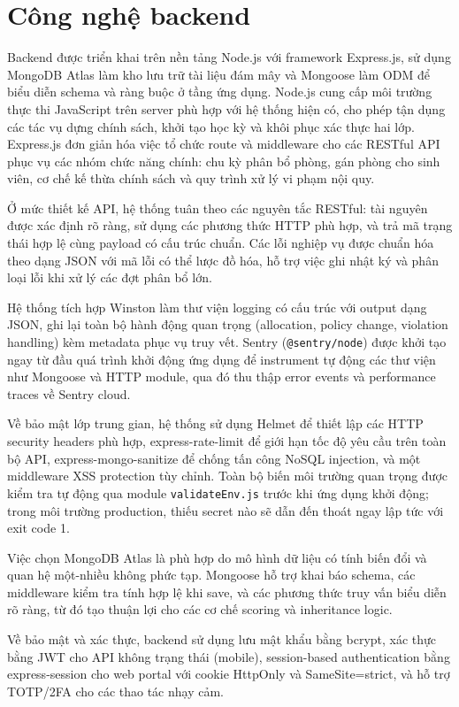﻿\documentclass[a4paper,12pt,openany,oneside]{report}
\begin{document}
\section{Công nghệ backend}

Backend được triển khai trên nền tảng Node.js với framework Express.js, sử dụng MongoDB Atlas làm kho lưu trữ tài liệu đám mây và Mongoose làm ODM để biểu diễn schema và ràng buộc ở tầng ứng dụng. Node.js cung cấp môi trường thực thi JavaScript trên server phù hợp với hệ thống hiện có, cho phép tận dụng các tác vụ dựng chính sách, khởi tạo học kỳ và khôi phục xác thực hai lớp. Express.js đơn giản hóa việc tổ chức route và middleware cho các RESTful API phục vụ các nhóm chức năng chính: chu kỳ phân bổ phòng, gán phòng cho sinh viên, cơ chế kế thừa chính sách và quy trình xử lý vi phạm nội quy.

Ở mức thiết kế API, hệ thống tuân theo các nguyên tắc RESTful: tài nguyên được xác định rõ ràng, sử dụng các phương thức HTTP phù hợp, và trả mã trạng thái hợp lệ cùng payload có cấu trúc chuẩn. Các lỗi nghiệp vụ được chuẩn hóa theo dạng JSON với mã lỗi có thể lược đồ hóa, hỗ trợ việc ghi nhật ký và phân loại lỗi khi xử lý các đợt phân bổ lớn.

Hệ thống tích hợp Winston làm thư viện logging có cấu trúc với output dạng
JSON, ghi lại toàn bộ hành động quan trọng (allocation, policy change, violation
handling) kèm metadata phục vụ truy vết. Sentry (\texttt{@sentry/node}) được
khởi tạo ngay từ đầu quá trình khởi động ứng dụng để instrument tự động các
thư viện như Mongoose và HTTP module, qua đó thu thập error events và performance
traces về Sentry cloud.

Về bảo mật lớp trung gian, hệ thống sử dụng Helmet để thiết lập các HTTP
security headers phù hợp, express-rate-limit để giới hạn tốc độ yêu cầu trên
toàn bộ API, express-mongo-sanitize để chống tấn công NoSQL injection, và một
middleware XSS protection tùy chỉnh. Toàn bộ biến môi trường quan trọng được
kiểm tra tự động qua module \texttt{validateEnv.js} trước khi ứng dụng khởi
động; trong môi trường production, thiếu secret nào sẽ dẫn đến thoát ngay lập
tức với exit code 1.

Việc chọn MongoDB Atlas là phù hợp do mô hình dữ liệu có tính biến đổi và quan hệ một-nhiều không phức tạp. Mongoose hỗ trợ khai báo schema, các middleware kiểm tra tính hợp lệ khi save, và các phương thức truy vấn biểu diễn rõ ràng, từ đó tạo thuận lợi cho các cơ chế scoring và inheritance logic.

Về bảo mật và xác thực, backend sử dụng lưu mật khẩu bằng bcrypt, xác thực
bằng JWT cho API không trạng thái (mobile), session-based authentication bằng
express-session cho web portal với cookie HttpOnly và SameSite=strict, và hỗ
trợ TOTP/2FA cho các thao tác nhạy cảm.
\end{document}
